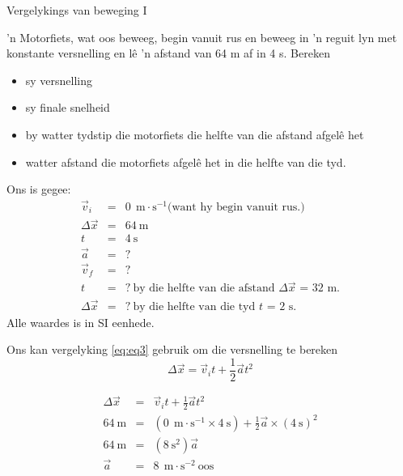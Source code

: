       \noindent
\begin{wex}{Vergelykings van beweging I}
{ 'n Motorfiets, wat oos beweeg, begin vanuit rus en beweeg in 'n reguit lyn met konstante versnelling en l\^e 'n afstand van 64 m af in 4 s. Bereken
\begin{itemize}
    \item sy versnelling
    \item sy finale snelheid
    \item by watter tydstip die motorfiets die helfte van die afstand afgel\^e het
    \item watter afstand die motorfiets afgel\^e het in die helfte van die tyd.
\end{itemize}}
{
Ons is gegee:
\begin{eqnarray*}
\vec{v}_i&=&0\ ~\text{m}\cdot \text{s}^{-1} \mbox{(want hy begin vanuit rus.)}\\
\Delta \vec{x}&=&64\ \text{m}\\
t&=&4\ \text{s}\\
\vec{a}&=&?\\
\vec{v}_f&=&?\\
t&=&?\ \mbox{by die helfte van die afstand $\Delta \vec{x}$~=~32~m.}\\
\Delta \vec{x}&=&?\ \mbox{by die helfte van die tyd $t$~=~2~s.}
\end{eqnarray*}
Alle waardes is in  SI eenhede.

Ons kan vergelyking \ref{eq:eq3} gebruik om die versnelling te bereken
\begin{displaymath}
\Delta \vec{x} = \vec{v}_it +\frac{1}{2}\vec{a}t^2
\end{displaymath}

\begin{eqnarray*}
\Delta \vec{x} &=& \vec{v}_it +\frac{1}{2}\vec{a}t^2\\
64\ \text{m} &=& (0\ ~\text{m}\cdot \text{s}^{-1} \times 4\ \text{s}) + \frac{1}{2} \vec{a} \times (4\ \text{s})^2\\
64\ \text{m} &=& (8\ \text{s}^2) \vec{a}\\
\vec{a} &=&8\ ~\text{m}\cdot \text{s}^{-2}~\text{oos}
\end{eqnarray*}

}
\end{wex}
